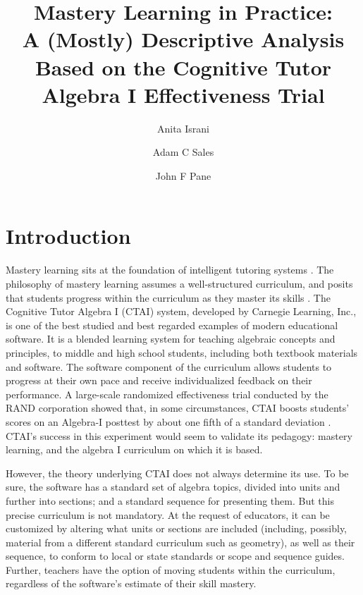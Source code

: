 \documentclass[12pt]{article}\usepackage[]{graphicx}\usepackage[]{color}
\title{Mastery Learning in Practice:\\
A (Mostly) Descriptive Analysis Based on the Cognitive Tutor Algebra I Effectiveness Trial}
\author{Anita Israni \and Adam C Sales \and John F Pane}
\begin{document}
\maketitle

\section{Introduction}
Mastery learning sits at the foundation of intelligent tutoring
systems \citep[e.g.][]{corbett2001cognitive,wenger2014artificial}.
The philosophy of mastery learning assumes a well-structured
curriculum, and posits that students progress within the curriculum as
they master its skills
\citep{bloom1968learning,kulik1990effectiveness}. The Cognitive Tutor
Algebra I (CTAI) system, developed by Carnegie Learning, Inc., is one of the best studied and best regarded examples of modern educational software. It is a blended learning system for teaching algebraic concepts and principles, to middle and high school students, including both textbook materials and software. The software component of the curriculum allows students to progress at their own pace and receive individualized feedback on their performance. A large-scale randomized effectiveness trial conducted by the RAND corporation showed that, in some circumstances, CTAI boosts students' scores on an Algebra-I posttest by about one fifth of a standard deviation \citep{pane2014effectiveness}. CTAI's success in this experiment would seem to validate its pedagogy: mastery learning, and the algebra I curriculum on which it is based.

However, the theory underlying CTAI does not always determine its
use. To be sure, the software has a standard set of algebra topics,
divided into units and further into sections; and a standard sequence
for presenting them. But this precise curriculum is not mandatory. At
the request of educators, it can be customized by altering what units
or sections are included (including, possibly, material from a
different standard curriculum such as geometry), as well as their
sequence, to conform to local or state standards or scope and sequence
guides. Further, teachers have the option of moving students within
the curriculum, regardless of the software's estimate of their skill
mastery.
\end{document}
